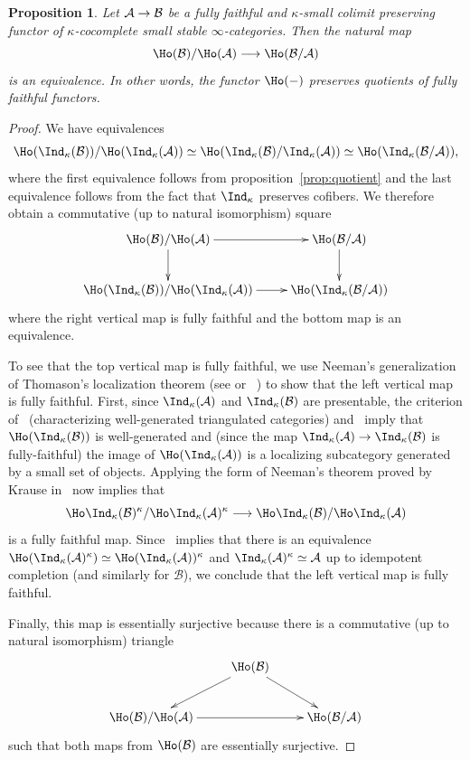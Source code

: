 \documentclass{amsart}
\newcommand{\htp}{\simeq}
\renewcommand{\to}{\mathchoice{\longrightarrow}{\rightarrow}{\rightarrow}{\rightarrow}}
\let\catsymbfont\mathcal
\newcommand{\aA}{{\catsymbfont{A}}}
\newcommand{\aB}{{\catsymbfont{B}}}
\renewcommand{\i}{\infty}
\numberwithin{equation}{section}
\newtheorem{proposition}[equation]{Proposition}
\theoremstyle{definition}
\begin{document}
\begin{proposition}\label{prop:kappaquotient}
Let $\aA\to\aB$ be a fully faithful and $\kappa$-small colimit
preserving functor of $\kappa$-cocomplete small stable
$\i$-categories.  Then the natural map
\[
\Ho(\aB)/\Ho(\aA)\to\Ho(\aB/\aA)
\]
is an equivalence.  In other words, the functor $\Ho(-)$ preserves quotients of fully faithful functors.
\end{proposition}

\begin{proof}
We have equivalences
\[
\Ho(\Ind_\kappa(\aB))/\Ho(\Ind_\kappa(\aA))\simeq\Ho(\Ind_\kappa(\aB)/\Ind_\kappa(\aA))\simeq\Ho(\Ind_\kappa(\aB/\aA)),
\]
where the first equivalence follows from
proposition~\ref{prop:quotient} and the last equivalence follows from
the fact that $\Ind_\kappa$ preserves cofibers.  We therefore obtain a
commutative (up to natural isomorphism) square 
\[
\xymatrix{
\Ho(\aB)/\Ho(\aA)\ar[r]\ar[d] & \Ho(\aB/\aA)\ar[d]\\
\Ho(\Ind_\kappa(\aB))/\Ho(\Ind_\kappa(\aA))\ar[r] & \Ho(\Ind_\kappa(\aB/\aA))}
\]
where the right vertical map is fully faithful and the bottom map
is an equivalence.  

To see that the top vertical map is fully faithful, we use 
Neeman's generalization of Thomason's localization theorem  
(see \cite[4.4.9]{Neeman} or ~\cite{NeemanLoc}) to show that the left
vertical map is fully faithful.  First, since $\Ind_{\kappa}(\aA)$ and
$\Ind_{\kappa}(\aB)$ are presentable, the criterion
of~\cite{Krausewell} (characterizing well-generated triangulated
categories) and~\cite[1.4.5.2]{HAG} imply that
$\Ho(\Ind_{\kappa}(\aB))$ is well-generated and (since the map 
$\Ind_{\kappa}(\aA) \to \Ind_{\kappa}(\aB)$ is fully-faithful) the
image of $\Ho(\Ind_{\kappa}(\aA))$ is a localizing subcategory
generated by a small set of objects.  Applying the form of Neeman's
theorem proved by Krause in~\cite[7.2.1]{Krausenotes} now implies that  
\[
\Ho\Ind_{\kappa}(\aB)^\kappa/\Ho\Ind_{\kappa}(\aA)^\kappa\to\Ho\Ind_{\kappa}(\aB)/\Ho\Ind_{\kappa}(\aA)
\]
is a fully faithful map.
Since~\cite[1.4.5.1]{HAG} implies that there is an equivalence
$\Ho(\Ind_{\kappa}(\aA)^{\kappa}) \htp \Ho(\Ind_{\kappa}(\aA))^{\kappa}$
and $\Ind_{\kappa}(\aA)^{\kappa} \htp \aA$ up to idempotent completion
(and similarly for $\aB$), we conclude that the left vertical map is
fully faithful.

Finally, this map is essentially surjective because there is a
commutative (up to natural isomorphism) triangle 
\[
\xymatrix{
& \Ho(\aB)\ar[ld]\ar[rd] & \\
\Ho(\aB)/\Ho(\aA)\ar[rr] & & \Ho(\aB/\aA)}
\]
such that both maps from $\Ho(\aB)$ are essentially surjective.
\end{proof}
\end{document}
